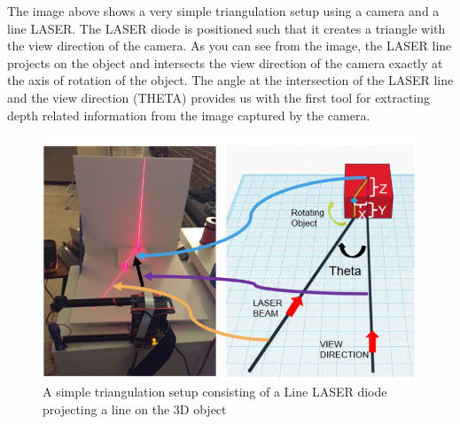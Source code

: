 \documentclass[12pt]{article}
\begin{document}
{\quad}The image above shows a very simple triangulation setup using a camera and a line LASER. The LASER diode is positioned such that it creates a triangle with the view direction of the camera. As you can see from the image, the LASER line projects on the object and intersects the view direction of the camera exactly at the axis of rotation of the object. The angle at the intersection of the LASER line and the view direction (THETA) provides us with the first tool for extracting depth related information from the image captured by the camera.
\begin{figure}
\includegraphics[scale=1]{lasercamera.jpg}
\caption{A simple triangulation setup consisting of a Line LASER diode projecting a line on the 3D object}
\end{figure}\\
\end{document}
